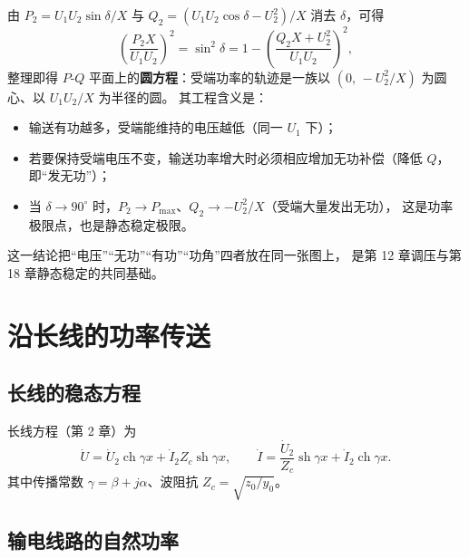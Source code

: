 由 $P_2=U_1U_2\sin\delta/X$ 与 $Q_2=(U_1U_2\cos\delta-U_2^{2})/X$ 消去 $\delta$，可得
\begin{equation}
  \left(\frac{P_2X}{U_1U_2}\right)^{2}
  =\sin^{2}\delta
  =1-\left(\frac{Q_2X+U_2^{2}}{U_1U_2}\right)^{2},
\end{equation}
整理即得 $P$-$Q$ 平面上的\textbf{圆方程}：受端功率的轨迹是一族以
$(0,\,-U_2^{2}/X)$ 为圆心、以 $U_1U_2/X$ 为半径的圆。
其工程含义是：
\begin{itemize}
  \item 输送有功越多，受端能维持的电压越低（同一 $U_1$ 下）；
  \item 若要保持受端电压不变，输送功率增大时必须相应增加无功补偿（降低 $Q$，即“发无功”）；
  \item 当 $\delta\to90^\circ$ 时，$P_2\to P_{\max}$、$Q_2\to-U_2^{2}/X$（受端大量发出无功），
        这是功率极限点，也是静态稳定极限。
\end{itemize}
这一结论把“电压”“无功”“有功”“功角”四者放在同一张图上，
是第 12 章调压与第 18 章静态稳定的共同基础。

\section{沿长线的功率传送}

\subsection{长线的稳态方程}

长线方程（第 2 章）为
\begin{equation}
  \dot U=\dot U_2\operatorname{ch}\gamma x+\dot I_2Z_c\operatorname{sh}\gamma x,\qquad
  \dot I=\frac{\dot U_2}{Z_c}\operatorname{sh}\gamma x+\dot I_2\operatorname{ch}\gamma x .
\end{equation}
其中传播常数 $\gamma=\beta+j\alpha$、波阻抗 $Z_c=\sqrt{z_0/y_0}$。

\subsection{输电线路的自然功率}


